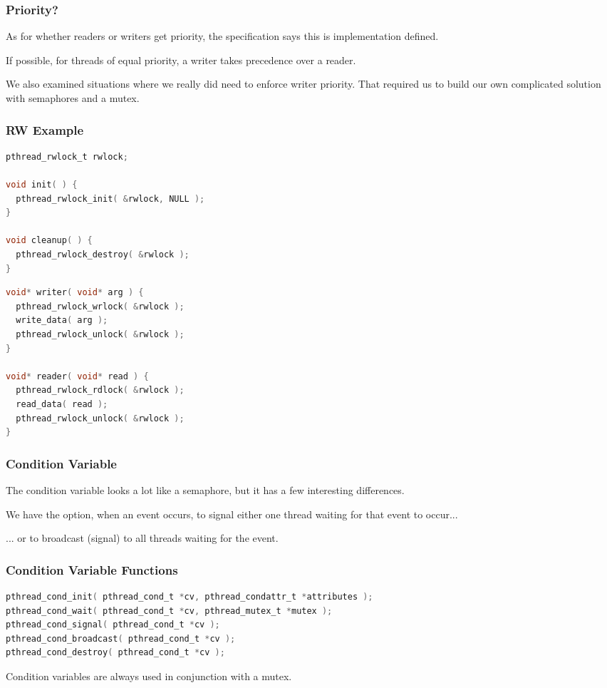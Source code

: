 \begin{frame}
\frametitle{Priority?}

As for whether readers or writers get priority, the specification says this is implementation defined. 

If possible, for threads of equal priority, a writer takes precedence over a reader. 

We also examined situations where we really did need to enforce writer priority. That required us to build our own complicated solution with semaphores and a mutex.

\end{frame}

\begin{frame}[fragile]
\frametitle{RW Example}

\begin{multicols}{2}
	\begin{lstlisting}[language=C]
pthread_rwlock_t rwlock;

void init( ) {
  pthread_rwlock_init( &rwlock, NULL );
}

void cleanup( ) {
  pthread_rwlock_destroy( &rwlock );
}
\end{lstlisting}

	\columnbreak

	\begin{lstlisting}[language=C]
void* writer( void* arg ) {
  pthread_rwlock_wrlock( &rwlock );
  write_data( arg );
  pthread_rwlock_unlock( &rwlock );
}

void* reader( void* read ) {
  pthread_rwlock_rdlock( &rwlock );
  read_data( read );
  pthread_rwlock_unlock( &rwlock );
}
\end{lstlisting}

\end{multicols}

\end{frame}

\begin{frame}
\frametitle{Condition Variable}

The condition variable looks a lot like a semaphore, but it has a few interesting differences. 

We have the option, when an event occurs, to signal either one thread waiting for that event to occur...

... or to broadcast (signal) to all threads waiting for the event.

\end{frame}

\begin{frame}[fragile]
\frametitle{Condition Variable Functions}

\begin{lstlisting}[language=C]
pthread_cond_init( pthread_cond_t *cv, pthread_condattr_t *attributes );
pthread_cond_wait( pthread_cond_t *cv, pthread_mutex_t *mutex );
pthread_cond_signal( pthread_cond_t *cv );
pthread_cond_broadcast( pthread_cond_t *cv );
pthread_cond_destroy( pthread_cond_t *cv );
\end{lstlisting}

Condition variables are always used in conjunction with a mutex.


\end{frame}

